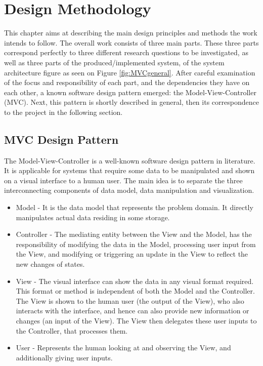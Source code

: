 \section{Design Methodology}

This chapter aims at describing the main design principles and methods the work intends to follow. The overall work consists of three main parts. These three parts correspond perfectly to three different research questions to be investigated, as well as three parts of the produced/implemented system, of the system architecture figure as seen on Figure \ref{fig:MVCgeneral}. After careful examination of the focus and responsibility of each part, and the dependencies they have on each other, a known software design pattern emerged: the Model-View-Controller (MVC). Next, this pattern is shortly described in general, then its correspondence to the project in the following section. 

\subsection{MVC Design Pattern}
The Model-View-Controller is a well-known software design pattern in literature. It is applicable for systems that require some data to be manipulated and shown on a visual interface to a human user. The main idea is to separate the three interconnecting components of data model, data manipulation and visualization.
\begin{itemize}
\item Model - It is the data model that represents the problem domain. It directly manipulates actual data residing in some storage. 
\item Controller - The mediating entity between the View and the Model, has the responsibility of modifying the data in the Model, processing user input from the View, and modifying or triggering an update in the View to reflect the new changes of states.
\item View - The visual interface can show the data in any visual format required. This format or method is independent of both the Model and the Controller. The View is shown to the human user (the output of the View), who also interacts with the interface, and hence can also provide new information or changes (an input of the View). The View then delegates these user inputs to the Controller, that processes them. 
\item User - Represents the human looking at and observing the View, and additionally giving user inputs.

\end{itemize}


  
  
  
  
  